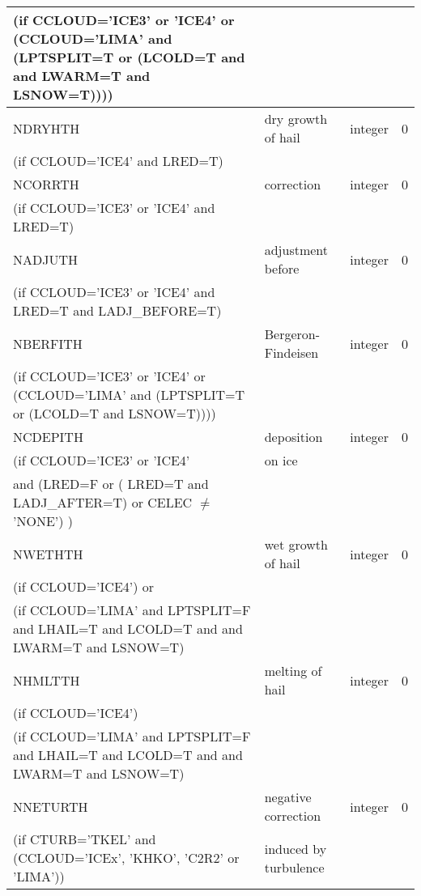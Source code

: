 \begin{longtable} {|p{}|p{}|>{\centering}p{}|p{}<{\centering}|}
(if CCLOUD='ICE3' or 'ICE4' or (CCLOUD='LIMA' and (LPTSPLIT=T or (LCOLD=T and and LWARM=T and LSNOW=T)))) & &   &  \\\hline
NDRYHTH  & dry growth of hail          & integer  &  0 \index{NDRYHTH!\innam{NAM\_BU\_RTH}}\\ \nopagebreak
(if CCLOUD='ICE4' and LRED=T) & &   &  \\\hline
NCORRTH  & correction          & integer  &  0 \index{NCORRTH!\innam{NAM\_BU\_RTH}}\\ \nopagebreak
(if CCLOUD='ICE3' or 'ICE4' and LRED=T) & &   &  \\\hline
NADJUTH  & adjustment before          & integer  &  0 \index{NADJUTH!\innam{NAM\_BU\_RTH}}\\ \nopagebreak
(if CCLOUD='ICE3' or 'ICE4' and LRED=T and LADJ\_BEFORE=T) & &   &  \\\hline
NBERFITH  & Bergeron-Findeisen   & integer  &  0 \index{NBERFITH!\innam{NAM\_BU\_RTH}}\\ \nopagebreak
(if CCLOUD='ICE3' or 'ICE4' or (CCLOUD='LIMA' and (LPTSPLIT=T or (LCOLD=T and LSNOW=T)))) & &   &  \\\hline
NCDEPITH  & deposition  & integer  &  0 \index{NCDEPITH!\innam{NAM\_BU\_RTH}}\\ \nopagebreak
(if CCLOUD='ICE3' or 'ICE4' & on ice   & &  \\
and (LRED=F or ( LRED=T and LADJ\_AFTER=T) or CELEC $\neq$ 'NONE')  ) & & & \\\hline
NWETHTH   & wet growth of hail   & integer  &  0 \index{NWETHTH!\innam{NAM\_BU\_RTH}}\\ \nopagebreak
(if CCLOUD='ICE4') or &  &        &   \\ \nopagebreak
(if CCLOUD='LIMA' and LPTSPLIT=F and LHAIL=T and LCOLD=T and and LWARM=T and LSNOW=T)   &  &        &   \\\hline
NHMLTTH   & melting of hail      & integer  &  0 \index{NHMLTTH!\innam{NAM\_BU\_RTH}}\\ \nopagebreak
(if CCLOUD='ICE4')   &   &       &   \\ \nopagebreak
(if CCLOUD='LIMA' and LPTSPLIT=F and LHAIL=T and LCOLD=T and and LWARM=T and LSNOW=T)   &  &        &   \\\hline
 NNETURTH  &  negative correction      & integer  &  0 \index{NNETURTH!\innam{NAM\_BU\_RTH}}\\ \nopagebreak
(if CTURB='TKEL' and (CCLOUD='ICEx', 'KHKO', 'C2R2' or 'LIMA'))   &induced by turbulence   &       &   \\\hline

\end{longtable}
